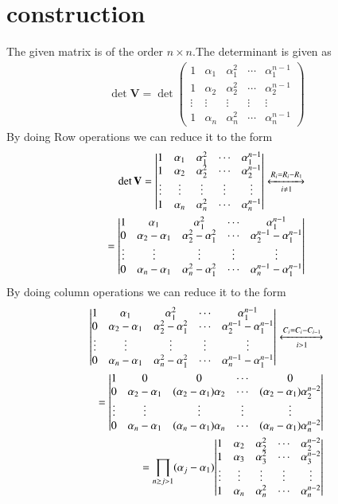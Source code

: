 \documentclass[journal,12pt,twocolumn]{IEEEtran}
\newcommand{\myvec}[1]{\ensuremath{\begin{pmatrix}#1\end{pmatrix}}}
\newcommand{\mydet}[1]{\ensuremath{\begin{vmatrix}#1\end{vmatrix}}}
\numberwithin{equation}{subsection}
\let\vec\mathbf
\begin{document}
\section{construction}
The given matrix is of the order $n\times n$.The determinant is given as
\begin{align}
    \det{\vec{V}}=\det{\myvec{1&\alpha_1&\alpha_1^2&\cdots&\alpha_1^{n-1}\\1&\alpha_2&\alpha_2^2&\cdots&\alpha_2^{n-1}\\\vdots&\vdots&\vdots&\vdots&\vdots\\1&\alpha_n&\alpha_n^2&\cdots&\alpha_n^{n-1}}}
\end{align}
By doing Row operations we can reduce it to the form
\begin{align}
    \det{\vec{V}}={\mydet{1&\alpha_1&\alpha_1^2&\cdots&\alpha_1^{n-1}\\1&\alpha_2&\alpha_2^2&\cdots&\alpha_2^{n-1}\\\vdots&\vdots&\vdots&\vdots&\vdots\\1&\alpha_n&\alpha_n^2&\cdots&\alpha_n^{n-1}}}\xleftrightarrow[i\neq 1]{{R_i=R_i-R_1}}\\
    =\mydet{1&\alpha_1&\alpha_1^2&\cdots&\alpha_1^{n-1}\\0&\alpha_2-\alpha_1&\alpha_2^2-\alpha_1^2&\cdots&\alpha_2^{n-1}-\alpha_1^{n-1}\\\vdots&\vdots&\vdots&\vdots&\vdots\\0&\alpha_{n}-\alpha_1&\alpha_{n}^2-\alpha_1^2&\cdots&\alpha_{n}^{n-1}-\alpha_1^{n-1}}
\end{align}
By doing column operations we can reduce it to the form
\begin{align}
    \mydet{1&\alpha_1&\alpha_1^2&\cdots&\alpha_1^{n-1}\\0&\alpha_2-\alpha_1&\alpha_2^2-\alpha_1^2&\cdots&\alpha_2^{n-1}-\alpha_1^{n-1}\\\vdots&\vdots&\vdots&\vdots&\vdots\\0&\alpha_{n}-\alpha_1&\alpha_{n}^2-\alpha_1^2&\cdots&\alpha_{n}^{n-1}-\alpha_1^{n-1}}\xleftrightarrow[i>1]{{C_i=C_i-C_{i-1}}}\\
    =\mydet{1&0&0&\cdots&0\\0&\alpha_2-\alpha_1&(\alpha_2-\alpha_1)\alpha_2&\cdots&(\alpha_2-\alpha_1)\alpha_2^{n-2}\\\vdots&\vdots&\vdots&\vdots&\vdots\\0&\alpha_{n}-\alpha_1&(\alpha_{n}-\alpha_1)\alpha_{n}&\cdots&(\alpha_{n}-\alpha_1)\alpha_{n}^{n-2}}\\
    =\prod_{n\geq j >1} (\alpha_{j}-\alpha_{1}) {\mydet{1&\alpha_2&\alpha_2^2&\cdots&\alpha_2^{n-2}\\1&\alpha_3&\alpha_3^2&\cdots&\alpha_3^{n-2}\\\vdots&\vdots&\vdots&\vdots&\vdots\\1&\alpha_{n}&\alpha_{n}^2&\cdots&\alpha_{n}^{n-2}}}\label{eq:2}
\end{align}
\end{document}
